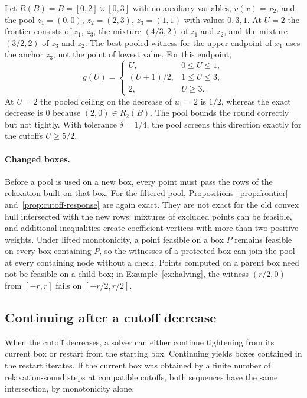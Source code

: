 \begin{example}\label{ex:frontier}
Let $R(B)=B=[0,2]\times[0,3]$ with no auxiliary variables, $v(x)=x_2$,
and the pool $z_1=(0,0)$, $z_2=(2,3)$, $z_3=(1,1)$ with values $0,3,1$.
At $U=2$ the frontier consists of $z_1$, $z_3$, the mixture
$(4/3,2)$ of $z_1$ and $z_2$, and the mixture $(3/2,2)$ of $z_3$ and $z_2$.
The best pooled witness for the upper endpoint of $x_1$ uses the anchor
$z_3$, not the point of lowest value. For this endpoint,
\[
 g(U)=\begin{cases}U,&0\le U\le1,\\ (U+1)/2,&1\le U\le3,\\ 2,&U\ge3.\end{cases}
\]
At $U=2$ the pooled ceiling on the decrease of $u_1=2$ is $1/2$, whereas
the exact decrease is $0$ because $(2,0)\in R_2(B)$. The pool bounds the
round correctly but not tightly. With tolerance $\delta=1/4$, the pool
screens this direction exactly for the cutoffs $U\ge5/2$.
\end{example}

\paragraph{Changed boxes.}
Before a pool is used on a new box, every point must pass the rows of
the relaxation built on that box. For the filtered pool,
Propositions~\ref{prop:frontier} and~\ref{prop:cutoff-response} are again
exact. They are not exact for the old convex hull intersected with the
new rows: mixtures of excluded points can be feasible, and additional
inequalities create coefficient vertices with more than two positive
weights. Under lifted monotonicity, a point feasible on a box $P$ remains
feasible on every box containing $P$, so the witnesses of a protected
box can join the pool at every containing node without a check. Points
computed on a parent box need not be feasible on a child box; in
Example~\ref{ex:halving}, the witness $(r/2,0)$ from $[-r,r]$ fails on
$[-r/2,r/2]$.

\subsection{Continuing after a cutoff decrease}\label{sec:cutoff-continue}

When the cutoff decreases, a solver can either continue tightening from
its current box or restart from the starting box. Continuing yields boxes
contained in the restart iterates. If the current box was obtained by a
finite number of relaxation-sound steps at compatible cutoffs, both
sequences have the same intersection, by monotonicity alone.

